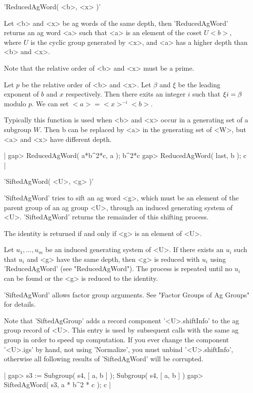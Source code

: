 'ReducedAgWord( <b>, <x> )'

Let  <b> and <x>  be ag  words of the   same depth, then  'ReducedAgWord'
returns an ag word <a> such that <a> is an element of  the coset $U <b>$,
where $U$ is  the  cyclic group generated  by  <x>, and <a> has  a higher
depth than <b> and <x>.

Note that the relative order of <b> and <x> must be a prime.

Let $p$ be the relative order  of <b> and  <x>.  Let $\beta$ and $\xi$ be
the leading exponent of $b$ and  $x$ respectively.   Then  there exits an
integer $i$ such that $\xi \* i = \beta$ modulo  $p$.  We  can set $<a> =
<x>^{-i} <b>$.

Typically this function is used when  <b>  and  <x> occur in a generating
set of a subgroup $W$.  Then b can be replaced by  <a>  in the generating
set of <W>, but <a> and <x> have different depth.

|    gap> ReducedAgWord( a*b^2*c, a );
    b^2*c
    gap> ReducedAgWord( last, b );
    c |


'SiftedAgWord( <U>, <g> )'

'SiftedAgWord' tries to sift  an ag word <g>, which must be an element of
the parent group of an ag group <U>, through an induced generating system
of <U>. 'SiftedAgWord' returns the remainder of this shifting process.

The identity is returned if and only if <g> is an element of <U>.

Let  $u_1, ..., u_m$  be an induced  generating system of  <U>.  If there
exists an $u_i$ such that $u_i$ and <g> have the  same depth, then <g> is
reduced  with $u_i$ using   'ReducedAgWord' (see  "ReducedAgWord").   The
process is repeated until no $u_i$ can be found or the  <g> is reduced to
the identity.

'SiftedAgWord' allows factor group arguments.  See "Factor  Groups of Ag
Groups" for details.

Note that 'SiftedAgGroup' adds a record component '<U>.shiftInfo' to the
ag group record of <U>.  This entry is used by  subsequent calls with the
same ag group in order to speed up  computation.  If you  ever change the
component '<U>.igs' by  hand,  not  using  'Normalize', you must   unbind
'<U>.shiftInfo', otherwise all following  results of 'SiftedAgWord' will
be corrupted.

|    gap> s3 := Subgroup( s4, [ a, b ] );
    Subgroup( s4, [ a, b ] )
    gap> SiftedAgWord( s3, a * b^2 * c );
    c |


